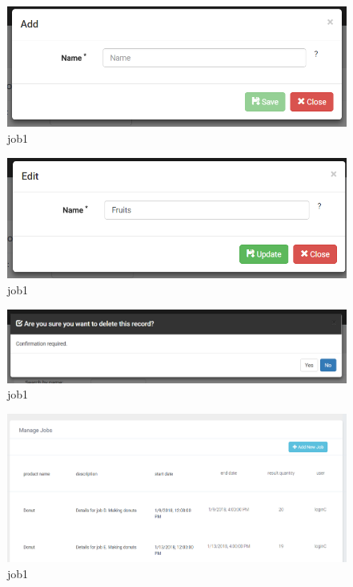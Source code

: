 \documentclass[a4paper,11pt,twoside]{report}
\theoremstyle{definition}
\begin{document}
\begin{figure}[h!]
\begin{center}
\includegraphics[width=\textwidth]{AS/categories/resource/2}
\end{center}
\caption{job1}
\end{figure}

\begin{figure}[h!]
\begin{center}
\includegraphics[width=\textwidth]{AS/categories/resource/3}
\end{center}
\caption{job1}
\end{figure}

\begin{figure}[h!]
\begin{center}
\includegraphics[width=\textwidth]{AS/categories/resource/4}
\end{center}
\caption{job1}
\end{figure}

\begin{figure}[h!]
\begin{center}
\includegraphics[width=\textwidth]{AS/jobs/1}
\end{center}
\caption{job1}
\end{figure}
\end{document}
